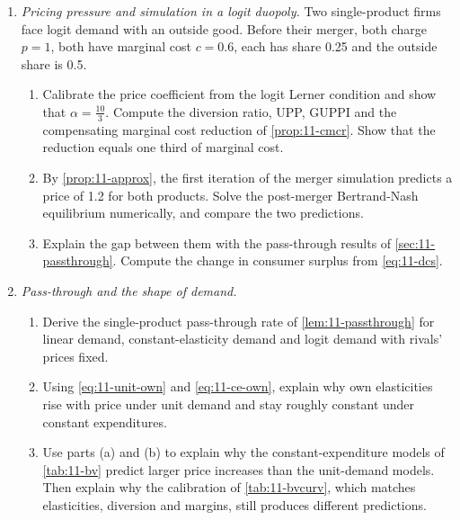 \begin{enumerate}[label=\arabic*., leftmargin=*, itemsep=6pt]
\item \emph{Pricing pressure and simulation in a logit duopoly.} Two single-product firms face logit demand with an
outside good. Before their merger, both charge $p = 1$, both have marginal cost $c = 0.6$, each has share 0.25 and
the outside share is 0.5.
\begin{enumerate}[label=(\alph*)]
\item Calibrate the price coefficient from the logit Lerner condition and show that $\alpha = \frac{10}{3}$. Compute
the diversion ratio, UPP, GUPPI and the compensating marginal cost reduction of \cref{prop:11-cmcr}. Show that the
reduction equals one third of marginal cost.
\item By \cref{prop:11-approx}, the first iteration of the merger simulation predicts a price of 1.2 for both
products. Solve the post-merger Bertrand-Nash equilibrium numerically, and compare the two predictions.
\item Explain the gap between them with the pass-through results of \cref{sec:11-passthrough}. Compute the change in
consumer surplus from \eqref{eq:11-dcs}.
\end{enumerate}

\item \emph{Pass-through and the shape of demand.}
\begin{enumerate}[label=(\alph*)]
\item Derive the single-product pass-through rate of \cref{lem:11-passthrough} for linear demand, constant-elasticity
demand and logit demand with rivals' prices fixed.
\item Using \eqref{eq:11-unit-own} and \eqref{eq:11-ce-own}, explain why own elasticities rise with price under unit
demand and stay roughly constant under constant expenditures.
\item Use parts (a) and (b) to explain why the constant-expenditure models of \cref{tab:11-bv} predict larger price
increases than the unit-demand models. Then explain why the calibration of \cref{tab:11-bvcurv}, which matches
elasticities, diversion and margins, still produces different predictions.
\end{enumerate}


\end{enumerate}

